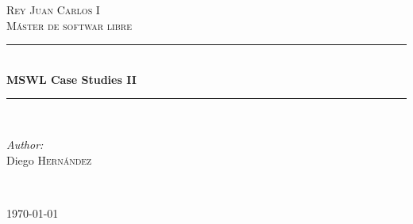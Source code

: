 \documentclass[12pt]{article} %
\begin{document}

\begin{titlepage}

\newcommand{\HRule}{\rule{\linewidth}{0.5mm}} %

\center %


\textsc{\LARGE Rey Juan Carlos I}\\[1.5cm] %
\textsc{\Large Máster de softwar libre}\\[0.5cm] %

\HRule \\[0.4cm]
{ \huge \bfseries MSWL Case Studies II}\\[0.4cm] %
\HRule \\[1.5cm]

\begin{minipage}{0.4\textwidth}
\begin{flushleft} \large
\emph{Author:}\\
Diego \textsc{Hernández} %
\end{flushleft}
\end{minipage}
~

{\large \today}\\[3cm] %


\vfill %

\end{titlepage}

\end{document}
